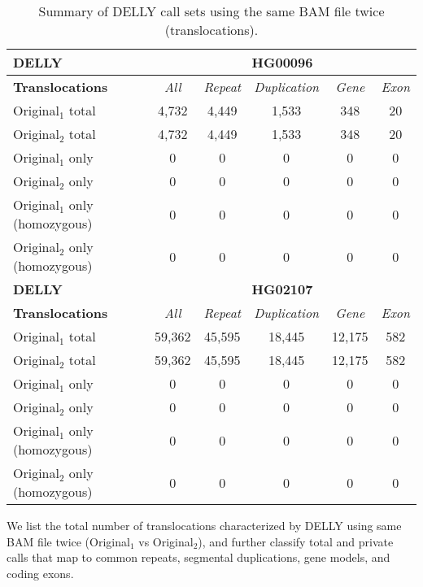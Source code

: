 \begin{table}[htb]
\caption{ Summary of DELLY call sets using the same BAM file twice (translocations). }
\begin{center}
\begin{tabular}{|l|c||c|c|c|c|}
\hline
{\bf DELLY} & \multicolumn{5}{|c|}{\bf HG00096} \\
\hline
\cline{2-6}
{\bf Translocations} & {\it All} & {\it Repeat} & {\it Duplication} & {\it Gene} & {\it Exon} \\
\hline
Original$_1$ total & 4,732 & 4,449 & 1,533 & 348 & 20\\ 
\hline
Original$_2$ total & 4,732 & 4,449 & 1,533 & 348 & 20\\ 
\hline
Original$_1$ only & 0 & 0 & 0 & 0 & 0\\ 
\hline
Original$_2$ only & 0 & 0 & 0 & 0 & 0\\ 
\hline
Original$_1$ only (homozygous) & 0 & 0 & 0 & 0 & 0\\ 
\hline
Original$_2$ only (homozygous) & 0 & 0 & 0 & 0 & 0\\ 
\hline
\hline
{\bf DELLY} & \multicolumn{5}{|c|}{\bf HG02107} \\
\hline
\cline{2-6}
{\bf Translocations} & {\it All} & {\it Repeat} & {\it Duplication} & {\it Gene} & {\it Exon} \\
\hline
Original$_1$ total & 59,362 & 45,595 & 18,445 & 12,175 & 582 \\
\hline
Original$_2$ total & 59,362 & 45,595 & 18,445 & 12,175 & 582 \\
\hline
Original$_1$ only & 0 & 0 & 0 & 0 & 0\\ 
\hline
Original$_2$ only & 0 & 0 & 0 & 0 & 0\\ 
\hline
Original$_1$ only (homozygous) & 0 & 0 & 0 & 0 & 0\\ 
\hline
Original$_2$ only (homozygous) & 0 & 0 & 0 & 0 & 0\\ 
\hline
\end{tabular}
\end{center}
{\footnotesize We list the total number of translocations characterized by DELLY using same BAM file twice (Original$_1$ vs Original$_2$), 
and further classify total and private calls that map to common repeats, segmental duplications, gene models, and coding exons.}
\label{supptab:orig-vs-orig2-delly-trans}
\end{table}


